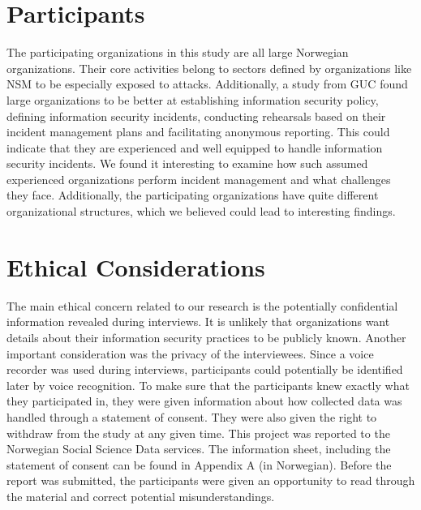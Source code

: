 \section{Participants}
The participating organizations in this study are all large Norwegian organizations. Their core activities belong to sectors defined by organizations like \acs{NSM} to be especially exposed to attacks. Additionally, a study from GUC found large organizations to be better at establishing information security policy, defining information security incidents, conducting rehearsals based on their incident management plans and facilitating anonymous reporting. This could indicate that they are experienced and well equipped to handle information security incidents. We found it interesting to examine how such assumed experienced organizations perform incident management and what challenges they face. Additionally, the participating organizations have quite different organizational structures, which we believed could lead to interesting findings.

\section{Ethical Considerations}
\label{sec:ethical}
The main ethical concern related to our research is the potentially confidential information revealed during interviews. It is unlikely that organizations want details about their information security practices to be publicly known. Another important consideration was the privacy of the interviewees. Since a voice recorder was used during interviews, participants could potentially be identified later by voice recognition. To make sure that the participants knew exactly what they participated in, they were given information about how collected data was handled through a statement of consent. They were also given the right to withdraw from the study at any given time. This project was reported to the Norwegian Social Science Data services. The information sheet, including the statement of consent can be found in Appendix A (in Norwegian). Before the report was submitted, the participants were given an opportunity to read through the material and correct potential misunderstandings.   

